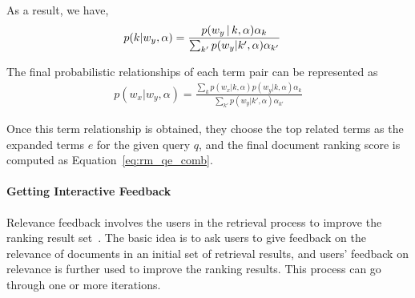 As a result, we have,
\begin{align}
p(k|w_y, \alpha) %
&= \frac{p(w_y \g k,\alpha) \alpha_k}{\sum_{k'} p(w_y|k',\alpha) \alpha_{k'}} \notag
\end{align}

The final probabilistic relationships of each term pair  can be represented as
\begin{align}
p(w_x|w_y, \alpha) = \frac{\sum_k p(w_x|k, \alpha) p(w_y|k,\alpha) \alpha_k }{\sum_{k'} p(w_y|k',\alpha) \alpha_{k'}}
\end{align}

Once this term relationship is obtained, they choose the top related
terms as the expanded terms $e$ for the given query $q$, and the final
document ranking score is computed as Equation~\ref{eq:rm_qe_comb}.

\paragraph{Getting Interactive Feedback}

Relevance feedback involves the users in the retrieval process to improve 
the ranking result set~\citep{Rocchio-1971}. The basic idea is to ask users 
to give feedback on the relevance of documents in an initial set of retrieval 
results, and users' feedback on relevance is further used to improve the 
ranking results. This process can go through one or more iterations.

